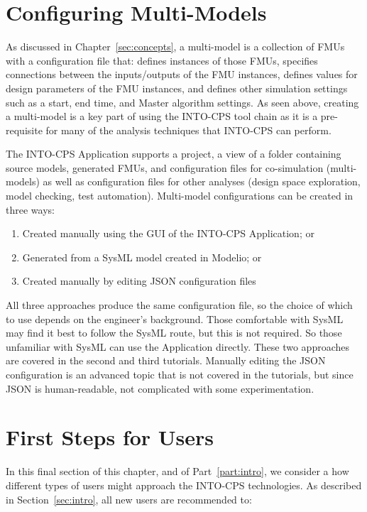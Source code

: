 \newpage
\section{Configuring Multi-Models}

As discussed in Chapter~\ref{sec:concepts}, a multi-model  is a collection of FMUs with a configuration file that: defines instances of those FMUs, specifies connections between the inputs/outputs of the FMU instances, defines values for design parameters of the FMU instances, and defines other simulation settings such as a start, end time, and Master algorithm settings. As seen above, creating a multi-model is a key part of using the INTO-CPS tool chain as it is a pre-requisite for many of the analysis techniques that INTO-CPS can perform.

The INTO-CPS Application supports a project, a view of a folder containing source models, generated FMUs, and configuration files for co-simulation (multi-models) as well as configuration files for other analyses (design space exploration, model checking, test automation). Multi-model configurations can be created in three ways:

\begin{enumerate}[noitemsep]
  \item Created manually using the GUI of the INTO-CPS Application; or
  \item Generated from a SysML model created in Modelio; or
  \item Created manually by editing JSON configuration files
\end{enumerate}

All three approaches produce the same configuration file, so the choice of which to use depends on the engineer's background. Those comfortable with SysML may find it best to follow the SysML route, but this is not required. So those unfamiliar with SysML can use the Application directly.
These two approaches are covered in the second and third tutorials. Manually editing the JSON configuration is an advanced topic that is not covered in the tutorials, but since JSON is human-readable, not complicated with some experimentation.

\section{First Steps for Users}

In this final section of this chapter, and of Part~\ref{part:intro}, we consider a how different types of users might approach the INTO-CPS technologies. As described in Section~\ref{sec:intro}, all new users are recommended to:

